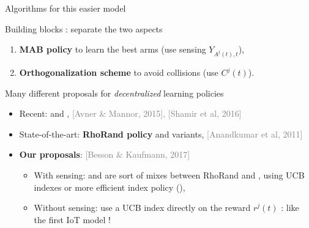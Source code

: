 \documentclass[12pt,english,ignorenonframetext,]{beamer}
\providecommand{\tightlist}{%
  \setlength{\itemsep}{0pt}\setlength{\parskip}{0pt}}
\begin{document}
\begin{frame}{Algorithms for this easier model}

\begin{block}{Building blocks : separate the two aspects}

\begin{enumerate}
\def\labelenumi{\arabic{enumi}.}
\tightlist
\item
  \textbf{MAB policy} to learn the best arms (use sensing
  \(Y_{A^j(t),t}\)),
\item
  \textbf{Orthogonalization scheme} to avoid collisions (use
  \(C^j(t)\)).
\end{enumerate}

\pause

\end{block}

\begin{block}{Many different proposals for \emph{decentralized} learning
policies}

\begin{itemize}
\tightlist
\item
  Recent: \MEGA{} and \MusicalChair{},
  \hfill{}{\tiny \textcolor{gray}{[Avner \& Mannor, 2015], [Shamir et al, 2016]}}
\item
  State-of-the-art: \textbf{RhoRand policy} and variants,
  \hfill{}{\tiny \textcolor{gray}{[Anandkumar et al, 2011]}}
\item
  \textbf{Our proposals}:
  \hfill{}{\tiny \textcolor{gray}{[Besson \& Kaufmann, 2017]}}

  \begin{itemize}
  \tightlist
  \item
    With sensing: \RandTopM{} and \MCTopM{} are sort of mixes between
    RhoRand and \MusicalChair{}, using UCB indexes or more efficient
    index policy (\klUCB),
  \item
    Without sensing: \Selfish{} use a UCB index directly on the reward
    \(r^j(t)\) : like the first IoT model !
  \end{itemize}
\end{itemize}

\end{block}

\end{frame}
\end{document}
